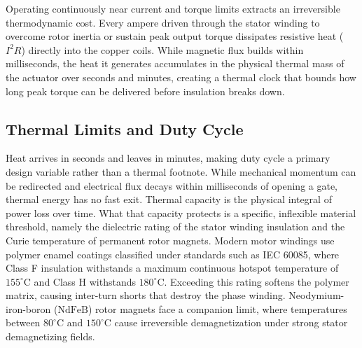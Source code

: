 \documentclass[
  letterpaper,
  DIV=11,
  numbers=noendperiod]{scrartcl}
\begin{document}
Operating continuously near current and torque limits extracts an
irreversible thermodynamic cost. Every ampere driven through the stator
winding to overcome rotor inertia or sustain peak output torque
dissipates resistive heat (\(I^2 R\)) directly into the copper coils.
While magnetic flux builds within milliseconds, the heat it generates
accumulates in the physical thermal mass of the actuator over seconds
and minutes, creating a thermal clock that bounds how long peak torque
can be delivered before insulation breaks down.

\subsection{Thermal Limits and Duty Cycle}\label{sec-body-2-5}

Heat arrives in seconds and leaves in minutes, making duty cycle a
primary design variable rather than a thermal footnote. While mechanical
momentum can be redirected and electrical flux decays within
milliseconds of opening a gate, thermal energy has no fast exit. Thermal
capacity is the physical integral of power loss over time. What that
capacity protects is a specific, inflexible material threshold, namely
the dielectric rating of the stator winding insulation and the Curie
temperature of permanent rotor magnets. Modern motor windings use
polymer enamel coatings classified under standards such as IEC 60085,
where Class F insulation withstands a maximum continuous hotspot
temperature of \(155^\circ\text{C}\) and Class H withstands
\(180^\circ\text{C}\). Exceeding this rating softens the polymer matrix,
causing inter-turn shorts that destroy the phase winding.
Neodymium-iron-boron (\(\text{NdFeB}\)) rotor magnets face a companion
limit, where temperatures between \(80^\circ\text{C}\) and
\(150^\circ\text{C}\) cause irreversible demagnetization under strong
stator demagnetizing fields.
\end{document}
